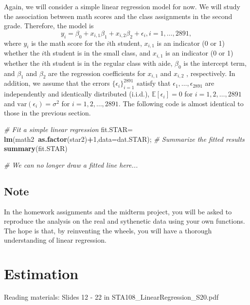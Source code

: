 \documentclass[12pt,]{book}
\newenvironment{Shaded}{\begin{snugshade}}{\end{snugshade}}
\newcommand{\KeywordTok}[1]{\textcolor[rgb]{0.13,0.29,0.53}{\textbf{#1}}}
\newcommand{\DataTypeTok}[1]{\textcolor[rgb]{0.13,0.29,0.53}{#1}}
\newcommand{\DecValTok}[1]{\textcolor[rgb]{0.00,0.00,0.81}{#1}}
\newcommand{\StringTok}[1]{\textcolor[rgb]{0.31,0.60,0.02}{#1}}
\newcommand{\CommentTok}[1]{\textcolor[rgb]{0.56,0.35,0.01}{\textit{#1}}}
\newcommand{\OperatorTok}[1]{\textcolor[rgb]{0.81,0.36,0.00}{\textbf{#1}}}
\newcommand{\NormalTok}[1]{#1}
\begin{document}
Again, we will consider a simple linear regression model for now. We
will study the association between math scores and the class assignments
in the second grade. Therefore, the model is \[
    y_i =\beta_0 + x_{i,1} \beta_1  +x_{i,2} \beta_2  +  \epsilon_i, i=1,\ldots, 2891,
    \] where \(y_i\) is the math score for the \(i\)th student,
\(x_{i,1}\) is an indicator (0 or 1) whether the \(i\)th student is in
the small class, and \(x_{i,1}\) is an indicator (0 or 1) whether the
\(i\)th student is in the regular class with aide, \(\beta_0\) is the
intercept term, and \(\beta_1\) and \(\beta_2\) are the regression
coefficients for \(x_{i,1}\) and \(x_{i,2}\) , respectively. In
addition, we assume that the errors \(\{\epsilon_i\}_{i=1}^{2891}\)
satisfy that \(\epsilon_1,\ldots, \epsilon_2891\) are independently and
identically distributed (i.i.d.), \(\mathbb{E}[\epsilon_i]= 0\) for
\(i=1,2,\ldots, 2891\) and \(\mathrm{var}(\epsilon_i)=\sigma^2\) for
\(i=1,2,\ldots, 2891\). The following code is almost identical to those
in the previous section.

\begin{Shaded}
\begin{Highlighting}[]
\CommentTok{# Fit a simple linear regression}
\NormalTok{fit.STAR=}\StringTok{ }\KeywordTok{lm}\NormalTok{(math2}\OperatorTok{~}\KeywordTok{as.factor}\NormalTok{(star2)}\OperatorTok{+}\DecValTok{1}\NormalTok{,}\DataTypeTok{data=}\NormalTok{dat.STAR); }
\CommentTok{# Summarize the fitted results}
\KeywordTok{summary}\NormalTok{(fit.STAR) }

\CommentTok{# We can no longer draw a fitted line here...}
\end{Highlighting}
\end{Shaded}

\section{Note}\label{note}

In the homework assignments and the midterm project, you will be asked
to reproduce the analysis on the real and sythenetic data using your own
functions. The hope is that, by reinventing the wheels, you will have a
thorough understanding of linear regression.

\chapter{Estimation}\label{ch:est}

Reading materials: Slides 12 - 22 in STA108\_LinearRegression\_S20.pdf
\end{document}
